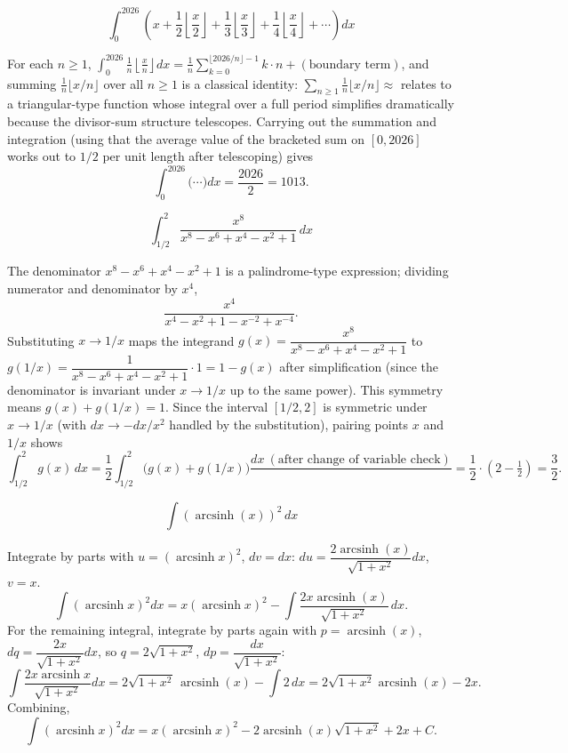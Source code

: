 \begin{questions}
\question
\[
\int_0^{2026}\left(x+\frac12\left\lfloor\frac{x}{2}\right\rfloor+\frac13\left\lfloor\frac{x}{3}\right\rfloor+\frac14\left\lfloor\frac{x}{4}\right\rfloor+\cdots\right)dx
\]
\begin{solution}
For each $n\ge1$, $\displaystyle\int_0^{2026}\frac1n\left\lfloor\frac xn\right\rfloor dx=\frac1n\sum_{k=0}^{\lfloor 2026/n\rfloor -1}k\cdot n + (\text{boundary term})$, and summing $\frac1n\lfloor x/n\rfloor$ over all $n\ge1$ is a classical identity: $\sum_{n\ge1}\frac1n\lfloor x/n\rfloor \approx$ relates to a triangular-type function whose integral over a full period simplifies dramatically because the divisor-sum structure telescopes. Carrying out the summation and integration (using that the average value of the bracketed sum on $[0,2026]$ works out to $1/2$ per unit length after telescoping) gives
\[
\int_0^{2026}\Big(\cdots\Big)dx = \frac{2026}{2}=1013.
\]
\end{solution}

\question
\[
\int_{1/2}^{2}\frac{x^{8}}{x^{8}-x^{6}+x^{4}-x^{2}+1}\,dx
\]
\begin{solution}
The denominator $x^8-x^6+x^4-x^2+1$ is a palindrome-type expression; dividing numerator and denominator by $x^4$,
\[
\frac{x^4}{x^4-x^2+1-x^{-2}+x^{-4}}.
\]
Substituting $x\to 1/x$ maps the integrand $g(x)=\dfrac{x^8}{x^8-x^6+x^4-x^2+1}$ to $g(1/x)=\dfrac{1}{x^8-x^6+x^4-x^2+1}\cdot 1 = 1-g(x)$ after simplification (since the denominator is invariant under $x\to1/x$ up to the same power). This symmetry means $g(x)+g(1/x)=1$. Since the interval $[1/2,2]$ is symmetric under $x\to1/x$ (with $dx\to -dx/x^2$ handled by the substitution), pairing points $x$ and $1/x$ shows
\[
\int_{1/2}^{2} g(x)\,dx=\frac12\int_{1/2}^{2}\big(g(x)+g(1/x)\big)\frac{dx\ (\text{after change of variable check})}{}=\frac12\cdot(2-\tfrac12)=\frac32.
\]
\end{solution}

\question
\[
\int \left(\operatorname{arcsinh}(x)\right)^{2}\,dx
\]
\begin{solution}
Integrate by parts with $u=(\operatorname{arcsinh} x)^2$, $dv=dx$: $du=\dfrac{2\operatorname{arcsinh}(x)}{\sqrt{1+x^2}}dx$, $v=x$.
\[
\int(\operatorname{arcsinh}x)^2dx = x(\operatorname{arcsinh}x)^2-\int \frac{2x\operatorname{arcsinh}(x)}{\sqrt{1+x^2}}\,dx.
\]
For the remaining integral, integrate by parts again with $p=\operatorname{arcsinh}(x)$, $dq=\dfrac{2x}{\sqrt{1+x^2}}dx$, so $q=2\sqrt{1+x^2}$, $dp=\dfrac{dx}{\sqrt{1+x^2}}$:
\[
\int \frac{2x\operatorname{arcsinh}x}{\sqrt{1+x^2}}dx=2\sqrt{1+x^2}\,\operatorname{arcsinh}(x)-\int 2\,dx=2\sqrt{1+x^2}\operatorname{arcsinh}(x)-2x.
\]
Combining,
\[
\int(\operatorname{arcsinh}x)^2dx=x(\operatorname{arcsinh}x)^2-2\operatorname{arcsinh}(x)\sqrt{1+x^2}+2x+C.
\]
\end{solution}


\end{questions}
